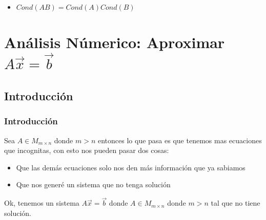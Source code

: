 \documentclass[12pt, fleqn]{report}                             %
\newenvironment{SmallIndentation}[1][0.75em]                    %
        {\begin{adjustwidth}{#1}{}\begin{footnotesize}}             %
        {\end{footnotesize}\end{adjustwidth}}                       %
\theoremstyle{break}                                            %
\begin{document}
\begin{itemize}
\begin{SmallIndentation}[1em]
                        
                        \end{SmallIndentation}

                        \item $Cond(AB) = Cond(A) Cond(B)$ 
                    

                \end{itemize}


\part{Análisis Númerico: Aproximar $A \vec x = \vec b$}

    \chapter{Introducción}

        \clearpage
        \section{Introducción}

            Sea $A \in M_{m \times n}$ donde $m > n$ entonces lo que pasa es que tenemos
            mas ecuaciones que incognitas, con esto nos pueden pasar dos cosas:
            \begin{itemize}
                \item Que las demás ecuaciones solo nos den más información que ya sabiamos
                \item Que nos generé un sistema que no tenga solución
            \end{itemize}

            Ok, tenemos un sistema $A \vec x = \vec b$ donde $A \in M_{m \times n}$ donde $m > n$
            tal que no tiene solución.
\end{document}
